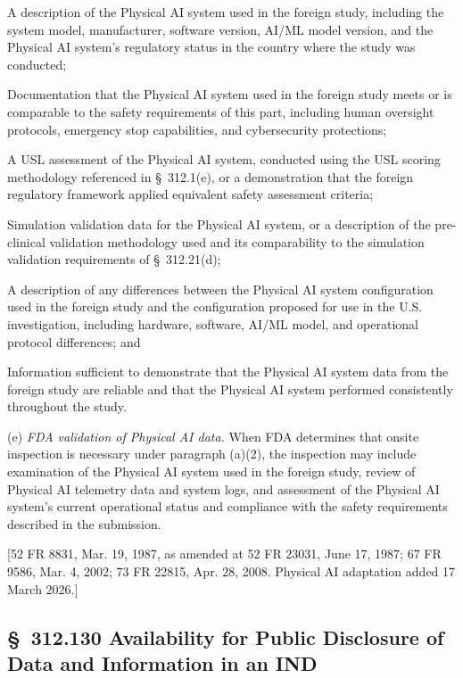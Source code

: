 \begin{description}[leftmargin=0.8cm,style=sameline]
\item[(i)] A description of the Physical AI system used in the foreign study, including the system model, manufacturer, software version, AI/ML model version, and the Physical AI system's regulatory status in the country where the study was conducted;
\item[(ii)] Documentation that the Physical AI system used in the foreign study meets or is comparable to the safety requirements of this part, including human oversight protocols, emergency stop capabilities, and cybersecurity protections;
\item[(iii)] A USL assessment of the Physical AI system, conducted using the USL scoring methodology referenced in \S~312.1(e), or a demonstration that the foreign regulatory framework applied equivalent safety assessment criteria;
\item[(iv)] Simulation validation data for the Physical AI system, or a description of the pre-clinical validation methodology used and its comparability to the simulation validation requirements of \S~312.21(d);
\item[(v)] A description of any differences between the Physical AI system configuration used in the foreign study and the configuration proposed for use in the U.S. investigation, including hardware, software, AI/ML model, and operational protocol differences; and
\item[(vi)] Information sufficient to demonstrate that the Physical AI system data from the foreign study are reliable and that the Physical AI system performed consistently throughout the study.
\end{description}

(e) \textit{FDA validation of Physical AI data.} When FDA determines that onsite inspection is necessary under paragraph (a)(2), the inspection may include examination of the Physical AI system used in the foreign study, review of Physical AI telemetry data and system logs, and assessment of the Physical AI system's current operational status and compliance with the safety requirements described in the submission.

[52 FR 8831, Mar. 19, 1987, as amended at 52 FR 23031, June 17, 1987; 67 FR 9586, Mar. 4, 2002; 73 FR 22815, Apr. 28, 2008. Physical AI adaptation added 17 March 2026.]

\subsection{\S~312.130 Availability for Public Disclosure of Data and Information in an IND}

